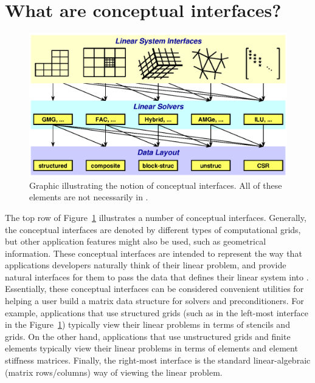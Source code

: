 
\section{What are conceptual interfaces?}
\label{sec-What-are-conceptual-interfaces}

\begin{figure}
\centering
\includegraphics[width=5in]{concep_iface}
\caption{%
Graphic illustrating the notion of conceptual interfaces.
All of these elements are not necessarily in \hypre{}.}
\label{fig-conceptual-interface}
\end{figure}

The top row of Figure~\ref{fig-conceptual-interface} illustrates a number of
conceptual interfaces.  Generally, the conceptual interfaces are denoted by
different types of computational grids, but other application features might
also be used, such as geometrical information.  These conceptual interfaces are
intended to represent the way that applications developers naturally think of
their linear problem, and provide natural interfaces for them to pass the data
that defines their linear system into \hypre{}.  Essentially, these conceptual
interfaces can be considered convenient utilities for helping a user build a
matrix data structure for \hypre{} solvers and preconditioners.  For example,
applications that use structured grids (such as in the left-most interface in
the Figure~\ref{fig-conceptual-interface}) typically view their linear problems
in terms of stencils and grids.  On the other hand, applications that use
unstructured grids and finite elements typically view their linear problems in
terms of elements and element stiffness matrices.  Finally, the right-most
interface is the standard linear-algebraic (matrix rows/columns) way of viewing
the linear problem.

